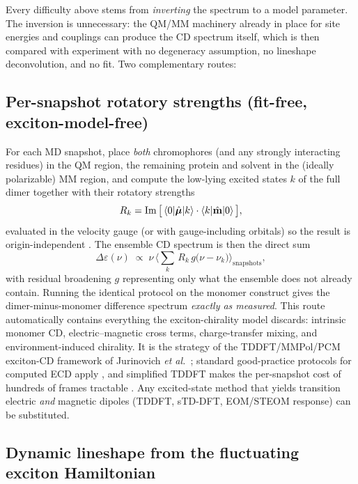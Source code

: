 \documentclass[11pt,a4paper]{article}
\newcommand{\muv}{\bm{\mu}}
\begin{document}
Every difficulty above stems from \emph{inverting} the spectrum to a model
parameter. The inversion is unnecessary: the QM/MM machinery already in place
for site energies and couplings can produce the CD spectrum itself, which is
then compared with experiment with no degeneracy assumption, no lineshape
deconvolution, and no fit. Two complementary routes:

\subsection{Per-snapshot rotatory strengths (fit-free, exciton-model-free)}

For each MD snapshot, place \emph{both} chromophores (and any strongly
interacting residues) in the QM region, the remaining protein and solvent in
the (ideally polarizable) MM region, and compute the low-lying excited states
$k$ of the full dimer together with their rotatory strengths
\begin{equation}
R_{k}=\operatorname{Im}\big[\braket{0|\hat{\muv}|k}\cdot\braket{k|\hat{\mathbf{m}}|0}\big],
\end{equation}
evaluated in the velocity gauge (or with gauge-including orbitals) so the
result is origin-independent \cite{autschbach2009}. The ensemble CD spectrum
is then the direct sum
\begin{equation}
\Delta\varepsilon(\nu)\;\propto\;\nu\,
\Big\langle{\textstyle\sum_{k}}\,R_{k}\,g\big(\nu-\nu_{k}\big)\Big\rangle_{\mathrm{snapshots}},
\label{eq:directcd}
\end{equation}
with residual broadening $g$ representing only what the ensemble does not
already contain. Running the identical protocol on the monomer construct gives
the dimer-minus-monomer difference spectrum \emph{exactly as measured}. This
route automatically contains everything the exciton-chirality model discards:
intrinsic monomer CD, electric--magnetic cross terms, charge-transfer mixing,
and environment-induced chirality. It is the strategy of the
TDDFT/MMPol/PCM exciton-CD framework of Jurinovich \emph{et
al.}~\cite{jurinovich2014}; standard good-practice protocols for computed ECD
apply \cite{pescitelli2016}, and simplified TDDFT makes the per-snapshot cost
of hundreds of frames tractable \cite{bannwarth2014}. Any excited-state
method that yields transition electric \emph{and} magnetic dipoles (TDDFT,
sTD-DFT, EOM/STEOM response) can be substituted.

\subsection{Dynamic lineshape from the fluctuating exciton Hamiltonian}
\end{document}
